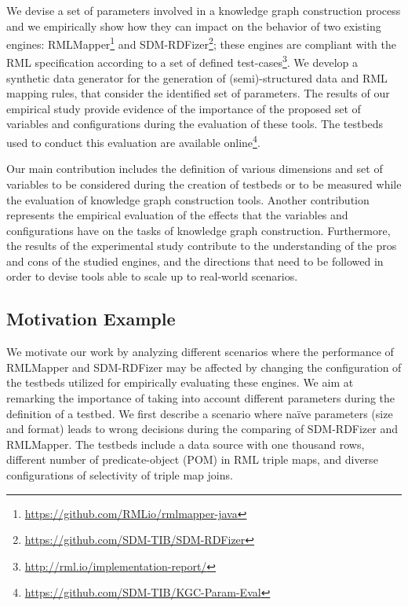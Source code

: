 We devise a set of parameters involved in a knowledge graph construction process and we empirically show how they can impact on the behavior of two existing engines: RMLMapper\footnote{\url{https://github.com/RMLio/rmlmapper-java}} and SDM-RDFizer\footnote{\url{https://github.com/SDM-TIB/SDM-RDFizer}}; these engines are compliant with the RML specification according to a set of defined test-cases\footnote{\url{http://rml.io/implementation-report/}}. We develop a synthetic data generator for the generation of (semi)-structured data and RML mapping rules, that consider the identified set of parameters. The results of our empirical study provide evidence of the importance of the proposed set of variables and configurations during the evaluation of these tools. The testbeds used to conduct this evaluation are available
online\footnote{\url{https://github.com/SDM-TIB/KGC-Param-Eval}}.

Our main contribution includes the definition of various dimensions and set of variables to be considered during the creation of testbeds or to be measured while the evaluation of knowledge graph construction tools. Another contribution represents the empirical evaluation of the effects that the variables and configurations have on the tasks of knowledge graph construction. Furthermore, the results of the experimental study contribute to the understanding of the pros and cons of the studied engines, and the directions that need to be followed in order to devise tools able to scale up to real-world scenarios.  

\subsection{Motivation Example}

We motivate our work by analyzing different scenarios where the performance of RMLMapper and SDM-RDFizer may be affected by changing the configuration of the testbeds utilized for empirically evaluating these engines. We aim at remarking the importance of taking into account different parameters during the definition of a testbed. We first describe a scenario where na\"ive parameters (size and format) leads to wrong decisions during the comparing of SDM-RDFizer and RMLMapper. The testbeds include a data source with one thousand rows, different number of predicate-object (POM) in RML triple maps, and diverse configurations of selectivity of triple map joins.


